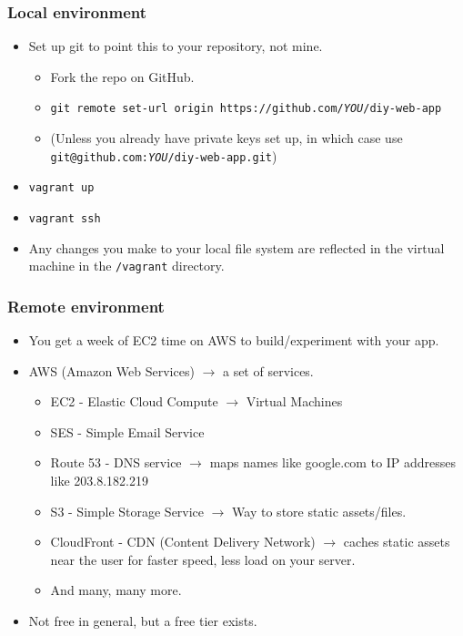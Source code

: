 \documentclass{beamer}
\begin{document}
\begin{frame}
  \frametitle{Local environment}
  \begin{itemize}
  \item Set up git to point this to your repository, not mine.
    \begin{itemize}
    \item Fork the repo on GitHub.
    \item \texttt{git remote set-url origin
        https://github.com/\textit{YOU}/diy-web-app}
    \item (Unless you already have private keys set up, in which case
      use \texttt{git@github.com:\textit{YOU}/diy-web-app.git})
    \end{itemize}
  \item \texttt{vagrant up}
  \item \texttt{vagrant ssh}
  \item Any changes you make to your local file system are reflected in the virtual machine in the \texttt{/vagrant} directory.
  \end{itemize}
\end{frame}

\begin{frame}
  \frametitle{Remote environment}
  
  \begin{itemize}
  \item You get a week of EC2 time on AWS to build/experiment with your app.
  \item AWS (Amazon Web Services) $\to$ a set of services.
    \begin{itemize}
    \item EC2 - Elastic Cloud Compute $\to$ Virtual Machines
    \item SES - Simple Email Service
    \item Route 53 - DNS service $\to$ maps names like google.com to
      IP addresses like 203.8.182.219
    \item S3 - Simple Storage Service $\to$ Way to store static assets/files.
    \item CloudFront - CDN (Content Delivery Network) $\to$ caches
      static assets near the user for faster speed, less load on your
      server.
    \item And many, many more.
    \end{itemize}
  \item Not free in general, but a free tier exists.
  \end{itemize}
\end{frame}
\end{document}
